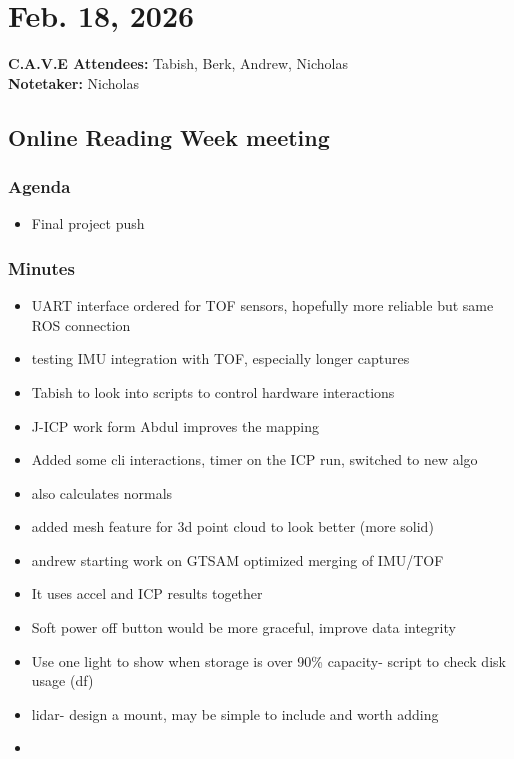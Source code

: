 	\pagebreak
	\section*{Feb. 18, 2026}

	\textbf{C.A.V.E Attendees:} Tabish, Berk, Andrew, Nicholas\\
	\textbf{Notetaker:} Nicholas

	\subsection*{Online Reading Week meeting}
		\subsubsection*{Agenda}
			\begin{itemize}
				\item Final project push
			\end{itemize}

		\subsubsection*{Minutes}
			\begin{itemize}
				\item UART interface ordered for TOF sensors, hopefully more reliable but same ROS connection
				\item testing IMU integration with TOF, especially longer captures
				\item Tabish to look into scripts to control hardware interactions
				\item J-ICP work form Abdul improves the mapping
				\item Added some cli interactions, timer on the ICP run, switched to new algo
				\item also calculates normals
				\item added mesh feature for 3d point cloud to look better (more solid)
				\item andrew starting work on GTSAM optimized merging of IMU/TOF
				\item It uses accel and ICP results together
				\item Soft power off button would be more graceful, improve data integrity 
				\item Use one light to show when storage is over 90\% capacity- script to check disk usage (df)
				\item lidar- design a mount, may be simple to include and worth adding 
				\item 
			\end{itemize}

